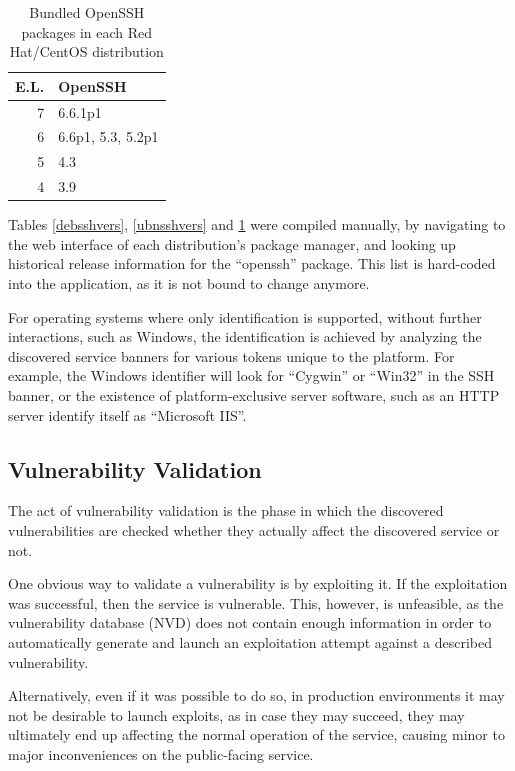 \documentclass[a4paper,12pt]{article}
\begin{document}
	\begin{table}[H]
		\centering
		\begin{tabular}{|rl|}
			\hline
			\textbf{E.L.} & \textbf{OpenSSH} \\ \hline
			7 & 6.6.1p1 \\
			6 & 6.6p1, 5.3, 5.2p1 \\
			5 & 4.3 \\
			4 & 3.9 \\ \hline
		\end{tabular}
		\caption{Bundled OpenSSH packages in each Red Hat/CentOS distribution}
		\label{elsshvers}
	\end{table}
	
	Tables \ref{debsshvers}, \ref{ubnsshvers} and \ref{elsshvers} were compiled manually, by navigating to the web interface of each distribution's package manager, and looking up historical release information for the ``openssh'' package. This list is hard-coded into the application, as it is not bound to change anymore.
	
	For operating systems where only identification is supported, without further interactions, such as Windows, the identification is achieved by analyzing the discovered service banners for various tokens unique to the platform. For example, the Windows identifier will look for ``Cygwin'' or ``Win32'' in the SSH banner, or the existence of platform-exclusive server software, such as an HTTP server identify itself as ``Microsoft IIS''.
	
\subsection{Vulnerability Validation} \label{vulnvalid}
 

	The act of vulnerability validation is the phase in which the discovered vulnerabilities are checked whether they actually affect the discovered service or not.
	
	One obvious way to validate a vulnerability is by exploiting it. If the exploitation was successful, then the service is vulnerable. This, however, is unfeasible, as the vulnerability database (NVD) does not contain enough information in order to automatically generate and launch an exploitation attempt against a described vulnerability.
	
	Alternatively, even if it was possible to do so, in production environments it may not be desirable to launch exploits, as in case they may succeed, they may ultimately end up affecting the normal operation of the service, causing minor to major inconveniences on the public-facing service.
	
\end{document}
